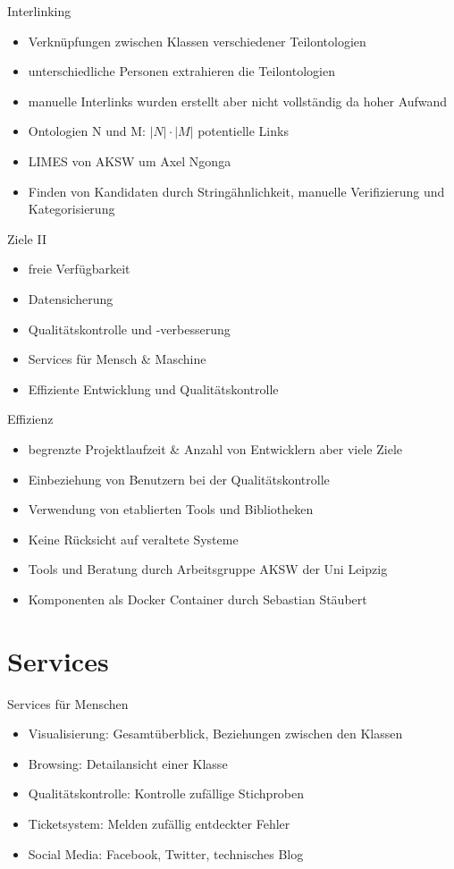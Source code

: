 \documentclass{beamer}
\begin{document}
\begin{frame}{Interlinking}
\begin{itemize}
\item Verknüpfungen zwischen Klassen verschiedener Teilontologien
\item unterschiedliche Personen extrahieren die Teilontologien 
\item manuelle Interlinks wurden erstellt aber nicht vollständig da hoher Aufwand
\item Ontologien N und M: $|N| \cdot |M|$ potentielle Links
\item LIMES von AKSW um Axel Ngonga
\item Finden von Kandidaten durch Stringähnlichkeit, manuelle Verifizierung und Kategorisierung
\end{itemize}
\end{frame}

\begin{frame}{Ziele II}
\begin{itemize}
\item freie Verfügbarkeit
\item Datensicherung
\item Qualitätskontrolle und -verbesserung
\pause
\item Services für Mensch \& Maschine
\item Effiziente Entwicklung und Qualitätskontrolle
\end{itemize}
\end{frame}

\begin{frame}{Effizienz}
\begin{itemize}
\item begrenzte Projektlaufzeit \& Anzahl von Entwicklern aber viele Ziele
\item Einbeziehung von Benutzern bei der Qualitätskontrolle 
\item Verwendung von etablierten Tools und Bibliotheken 
\item Keine Rücksicht auf veraltete Systeme
\item Tools und Beratung durch Arbeitsgruppe AKSW der Uni Leipzig
\item Komponenten als Docker Container durch Sebastian Stäubert 
\end{itemize}
\end{frame}

\section{Services}
\begin{frame}{Services für Menschen}
\begin{itemize}
\item Visualisierung: Gesamtüberblick, Beziehungen zwischen den Klassen
\item Browsing: Detailansicht einer Klasse
\item Qualitätskontrolle: Kontrolle zufällige Stichproben
\item Ticketsystem: Melden zufällig entdeckter Fehler 
\item Social Media: Facebook, Twitter, technisches Blog
\end{itemize}
\end{frame}
\end{document}
